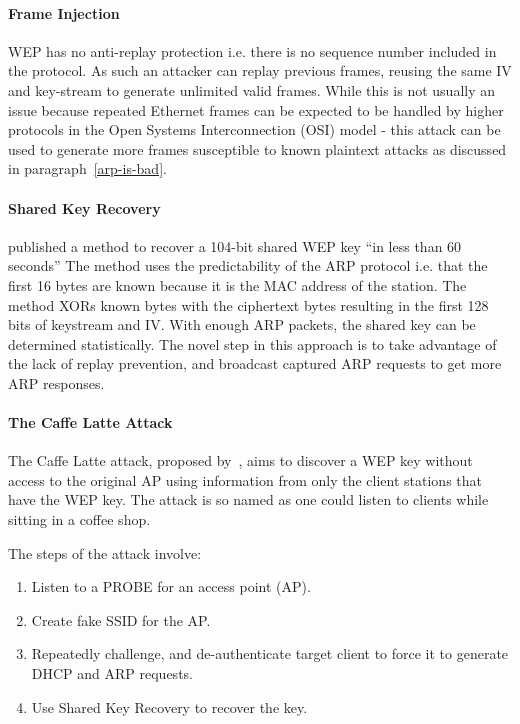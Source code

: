 \documentclass[pdftex, 11pt, a4paper]{article}
\begin{document}
\paragraph{Frame Injection}
WEP has no anti-replay protection i.e. there is no sequence number included in the protocol.  As such an attacker can replay previous frames, reusing the same IV and key-stream to generate unlimited valid frames.  While this is not usually an issue because repeated Ethernet frames can be expected to be handled by higher protocols in the Open Systems Interconnection (OSI) model - this attack can be used to generate more frames susceptible to known plaintext attacks as discussed in paragraph~\ref{arp-is-bad}.

\paragraph{Shared Key Recovery}
\textcite{tews2007breaking} published a method to recover a 104-bit shared WEP key ``in less than 60 seconds''  The method uses the predictability of the ARP protocol i.e. that the first 16 bytes are known because it is the MAC address of the station.  The method XORs known bytes with the ciphertext bytes resulting in the first 128 bits of keystream and IV. With enough ARP packets, the shared key can be determined statistically.  The novel step in this approach is to take advantage of the lack of replay prevention, and broadcast captured ARP requests to get more ARP responses\label{arp-is-bad}.

\paragraph{The Caffe Latte Attack}
The Caffe Latte attack, proposed by~\textcite{cafe}, aims to discover a WEP key without access to the original AP using information from only the client stations that have the WEP key. The attack is so named as one could listen to clients while sitting in a coffee shop.

The steps of the attack involve:
\begin{enumerate}
    \item Listen to a PROBE for an access point (AP).
    \item Create fake SSID for the AP.
    \item Repeatedly challenge, and de-authenticate target client to force it to generate DHCP and ARP requests.
    \item Use Shared Key Recovery to recover the key.
\end{enumerate}
\end{document}
